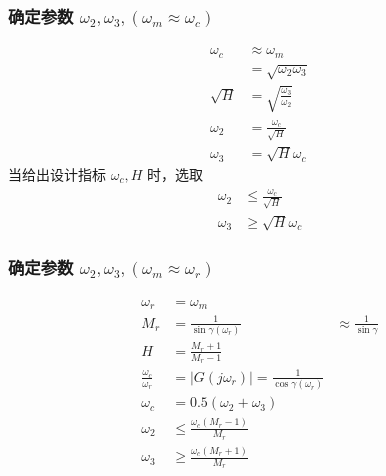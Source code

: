\documentclass[table]{beamer}
\begin{document}
\begin{frame}
\frametitle{确定参数 $\omega_2,\omega_3,(\omega_m\approx\omega_c)$}
\label{sec-5-1-4}

\begin{align*}
\omega_c &\approx\omega_m \\
         &=\sqrt{\omega_2\omega_3}\\
\sqrt{H} &=\sqrt{\frac{\omega_3}{\omega_2}}\\
\omega_2 & = \frac{\omega_c}{\sqrt{H}} \\
\omega_3 & = \sqrt{H}\omega_c
\end{align*}
当给出设计指标 $\omega_c,H$ 时，选取
\begin{align*}
\omega_2 &\leq \frac{\omega_c}{\sqrt{H}} \\
\omega_3 &\geq \sqrt{H}\omega_c
\end{align*}
\end{frame}
\begin{frame}
\frametitle{确定参数 $\omega_2,\omega_3,(\omega_m\approx\omega_r)$}
\label{sec-5-1-5}

\begin{align*}
\omega_r &=\omega_m \\
M_r &=\frac{1}{\sin\gamma(\omega_r)}&\approx \frac{1}{\sin\gamma} \\
H &=\frac{M_r+1}{M_r-1}\\
\frac{\omega_c}{\omega_r} &=|G(j\omega_r)|=\frac{1}{\cos\gamma(\omega_r)}\\
\omega_c &=0.5(\omega_2+\omega_3)\\
\omega_2 & \leq \frac{\omega_c(M_r-1)}{M_r} \\
\omega_3 & \geq \frac{\omega_c(M_r+1)}{M_r} 
\end{align*}
\end{frame}
\end{document}
